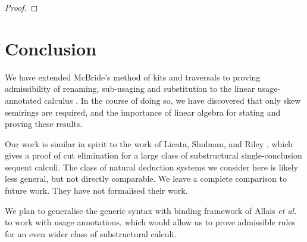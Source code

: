 \documentclass[submission,copyright,creativecommons]{eptcs}
\begin{document}
\begin{proof}
%
\end{proof}

\section{Conclusion}\label{sec:conclusion}

We have extended McBride's method of kits and traversals to proving
admissibility of renaming, sub-usaging and substitution to the linear
usage-annotated calculus \name{}. In the course of doing so, we have
discovered that only skew semirings are required, and the importance
of linear algebra for stating and proving these results.




Our work is similar in spirit to the work of Licata, Shulman, and
Riley \cite{LicataSR17}, which gives a proof of cut elimination for a
large class of substructural single-conclusion sequent calculi.  The
class of natural deduction systems we consider here is likely less
general, but not directly comparable. We leave a complete comparison
to future work. They have not formalised their work.

We plan to generalise the generic syntax with binding framework of
Allais \emph{et al.}~\cite{AACMM20} to work with usage annotations,
which would allow us to prove admissible rules for an even wider class
of substructural calculi.



\end{document}
